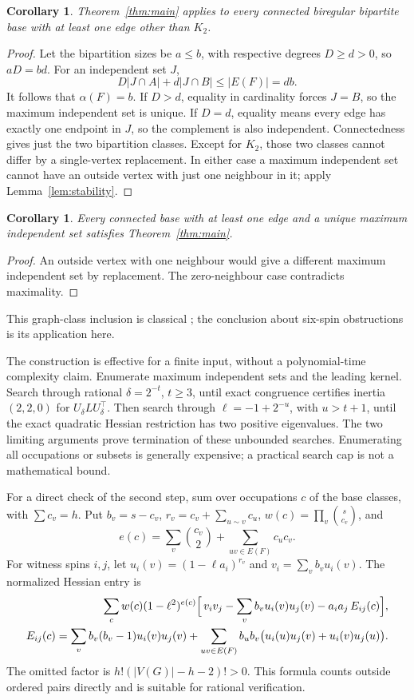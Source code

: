 \documentclass[11pt]{article}
\newtheorem{corollary}[theorem]{Corollary}
\theoremstyle{remark}\newtheorem{remark}[theorem]{Remark}
\begin{document}
\begin{corollary}\label{cor:biregular}
Theorem~\ref{thm:main} applies to every connected biregular
bipartite base with at least one edge other than $K_2$.
\end{corollary}
\begin{proof}
Let the bipartition sizes be $a\le b$, with respective degrees
$D\ge d>0$, so $aD=bd$. For an independent set $J$,
\[
 D|J\cap A|+d|J\cap B|\le |E(F)|=db.
\]
It follows that $\alpha(F)=b$. If $D>d$, equality in cardinality
forces $J=B$, so the maximum independent set is unique.
If $D=d$, equality means every edge has exactly one endpoint in
$J$, so the complement is also independent. Connectedness gives
just the two bipartition classes. Except for $K_2$, those two
classes cannot differ by a single-vertex replacement.
In either case a maximum independent set cannot have an outside
vertex with just one neighbour in it; apply Lemma~\ref{lem:stability}.
\end{proof}

\begin{corollary}
Every connected base with at least one edge and a unique maximum
independent set satisfies Theorem~\ref{thm:main}.
\end{corollary}
\begin{proof}
An outside vertex with one neighbour would give a different maximum
independent set by replacement. The zero-neighbour case contradicts
maximality.
\end{proof}
This graph-class inclusion is classical \cite[Lemma 2.3]{LMStructure};
the conclusion about six-spin obstructions is its application here.

The construction is effective for a finite input, without a
polynomial-time complexity claim. Enumerate maximum independent
sets and the leading kernel. Search through rational
$\delta=2^{-t}$, $t\ge3$, until exact congruence certifies
inertia $(2,2,0)$ for $U_\delta L U_\delta^\top$.
Then search through $\ell=-1+2^{-u}$, with $u>t+1$, until the exact
quadratic Hessian restriction has two positive eigenvalues.
The two limiting arguments prove termination of these unbounded
searches. Enumerating all occupations or subsets is generally
expensive; a practical search cap is not a mathematical bound.

For a direct check of the second step, sum over occupations $c$
of the base classes, with $\sum c_v=h$. Put
$b_v=s-c_v$,
$r_v=c_v+\sum_{u\sim v}c_u$,
$w(c)=\prod_v\binom{s}{c_v}$, and
\[
 e(c)=\sum_v\binom{c_v}{2}+\sum_{uv\in E(F)}c_uc_v.
\]
For witness spins $i,j$, let $u_i(v)=(1-\ell a_i)^{r_v}$ and
$v_i=\sum_vb_vu_i(v)$. The normalized Hessian entry is
\begin{align}
 \sum_c w(c)(1-\ell^2)^{e(c)}
 \Bigl[\,v_iv_j-\sum_vb_vu_i(v)u_j(v)
       -a_ia_j\,E_{ij}(c)\Bigr],                \label{eq:direct}\\
 E_{ij}(c)=
 \sum_vb_v(b_v-1)u_i(v)u_j(v)
 +\sum_{uv\in E(F)}b_ub_v
 \bigl(u_i(u)u_j(v)+u_i(v)u_j(u)\bigr).
 \nonumber
\end{align}
The omitted factor is $h!(|V(G)|-h-2)!>0$.
This formula counts outside ordered pairs directly and is suitable
for rational verification.
\end{document}
